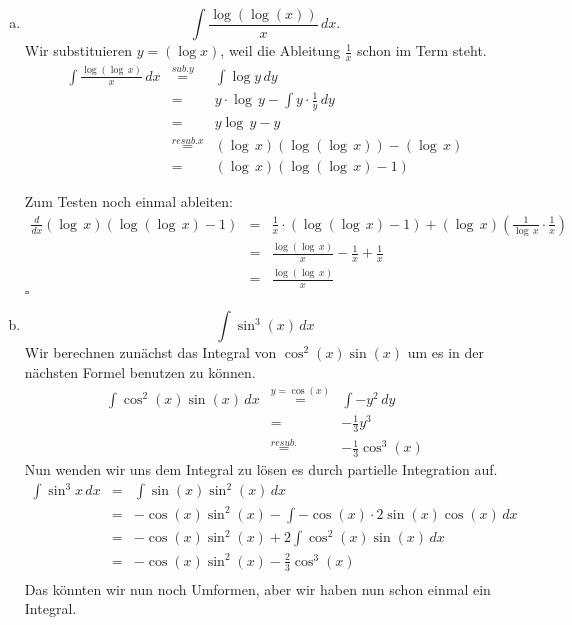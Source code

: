 \documentclass[11pt,a4paper,ngerman]{article}
\begin{document}
\begin{enumerate}[a.]
    
    \item
        $$
            \int \frac{\log ( \log (x))}{x} \, dx.
        $$
        Wir substituieren $y=(\log x)$, weil die Ableitung $\frac{1}{x}$
        schon im Term steht.
        $$\begin{array}{rcl}
            \int \frac{\log ( \log \, x)}{x} \, dx
                &\stackrel{sub. y}{=}& \int \log y \, dy\\
                &=& y \cdot \log \, y - \int y \cdot \frac{1}{y} \, dy\\
                &=& y \log \, y - y\\
                &\stackrel{resub. x}{=}& (\log \, x)(\log (\log \, x)) - (\log \, x)\\
                &=& (\log \, x)(\log(\log \, x) - 1)
        \end{array}$$

        Zum Testen noch einmal ableiten:
        $$\begin{array}{rcl}
            \frac{d}{dx} (\log \, x)(\log(\log \, x) - 1)
                &=& \frac{1}{x}\cdot(\log(\log \, x) - 1) + (\log \, x)(\frac{1}{\log \, x} \cdot \frac{1}{x})\\
                &=& \frac{\log(\log \, x)}{x} - \frac{1}{x} + \frac{1}{x}\\
                &=& \frac{\log(\log \, x)}{x}
        \end{array}$$
        \mbox{} \hfill $\square$
    \item
        $$
            \int \sin^3 (x) \, dx
        $$
        Wir berechnen zunächst das Integral von $\cos^2(x)\sin(x)$ um es in der nächsten
        Formel benutzen zu können.
        $$\begin{array}{rcl}
            \int \cos^2(x)\sin(x) \, dx &\stackrel{y=\cos(x)}{=}&
                \int -y^2 \, dy\\
                &=& -\frac{1}{3} y^3\\
                &\stackrel{resub.}{=}& -\frac{1}{3} \cos^3(x)
        \end{array}$$
        Nun wenden wir uns dem Integral zu lösen es durch partielle Integration auf.
        $$\begin{array}{rcl}
            \int \sin^3 x \, dx &=& \int \sin(x) \sin^2(x) \, dx\\
                &=& -\cos(x)\sin^2(x) - \int -\cos(x)\cdot 2 \sin(x) \cos(x) \, dx\\
                &=& - \cos(x)\sin^2(x) + 2 \int \cos^2(x)\sin(x) \, dx \\
                &=& - \cos(x)\sin^2(x) - \frac{2}{3} \cos^3(x)\\
        \end{array}$$
        Das könnten wir nun noch Umformen, aber wir haben nun schon einmal ein Integral.


\end{enumerate}
\end{document}
